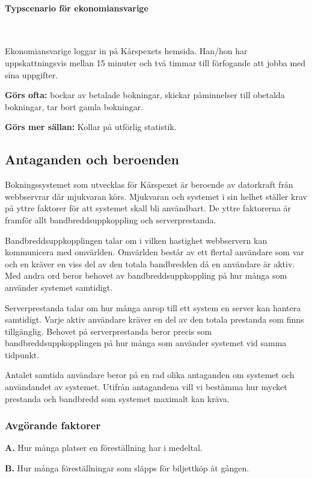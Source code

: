 \documentclass[a4paper, twoside, 11pt, titlepage]{article}
\begin{document}
			\paragraph{Typscenario för ekonomiansvarige}\

			Ekonomiansvarige loggar in på Kårspexets hemsida. Han/hon har uppskattningsvis mellan 15 minuter och två timmar till förfogande att jobba med sina uppgifter.

			\textbf{Görs ofta:} bockar av betalade bokningar, skickar påminnelser till obetalda bokningar, tar bort gamla bokningar.

			\textbf{Görs mer sällan:} Kollar på utförlig statistik.

	\subsection{Antaganden och beroenden}


	Bokningssystemet som utvecklas för Kårspexet är beroende av datorkraft från webbservrar där mjukvaran körs. Mjukvaran och systemet i sin helhet ställer krav på yttre faktorer för att systemet skall bli användbart. De yttre faktorerna är framför allt bandbreddsuppkoppling och serverprestanda.

	Bandbreddsuppkopplingen talar om i vilken hastighet webbservern kan kommunicera med omvärlden. Omvärlden består av ett flertal användare som var och en kräver en viss del av den totala bandbredden då en användare är aktiv. Med andra ord beror behovet av bandbreddsuppkoppling på hur många som använder systemet samtidigt.

	Serverprestanda talar om hur många anrop till ett system en server kan hantera samtidigt. Varje aktiv användare kräver en del av den totala prestanda som finns tillgänglig. Behovet på serverprestanda beror precis som bandbreddsuppkopplingen på hur många som använder systemet vid samma tidpunkt.

	Antalet samtida användare beror på en rad olika antaganden om systemet och användandet av systemet. Utifrån antagandena vill vi bestämma hur mycket prestanda och bandbredd som systemet maximalt kan kräva.

		\subsubsection{Avgörande faktorer}


		\textbf{A.} Hur många platser en föreställning har i medeltal.

		\textbf{B.} Hur många föreställningar som släpps för biljettköp åt gången.
\end{document}
